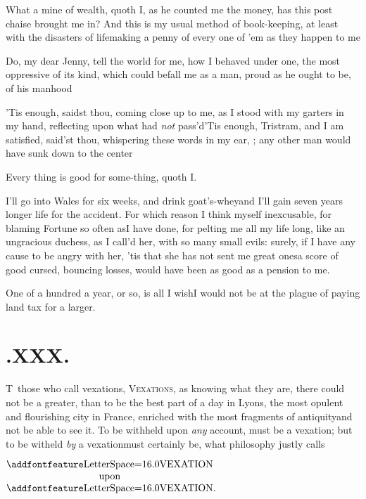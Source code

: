 \documentclass{article}
\begin{document}
\newpage
\tsh What a mine of wealth, quoth I, as\break
he counted me the money, has this post chaise brought me in? And
this is my usual method of book-keeping, at least with the
disasters of life\tsk making a penny of every one of ’em as they
happen to me\tsh

\tsh Do, my dear Jenny, tell the world for me,
how I behaved under one, the most oppressive of its kind, which
could befall me as a man, proud as he ought to be, of his
manhood\tsh

’Tis enough, saidst thou, coming close up to me, as I
stood with my garters in my hand, reflecting upon what had \textit{not}
pass’d\tsh ’Tis enough, Tristram, and I
am satisfied, said’st thou, whispering these\break
words in my ear,   \break
{} ;\tsk{}  \pb
\tsh any other man would have sunk down
to the center\tsh

\tsh Every thing is good for some-\break thing, quoth I.

\tsh I’ll go into Wales for six weeks, and drink goat’s-whey\tsk and I’ll gain seven
years longer life for the accident. For which reason I think myself inexcusable, for
blaming Fortune so often as\break I have done, for pelting me all my life long, like an
ungracious duchess, as I call’d her, with so many small evils: surely, if I have any
cause to be angry with her, ’tis that she has not sent me great ones\tsk a score of
good cursed, bouncing losses, would have been as good as a pension to me.

\newpage
\tsh One of a hundred a year, or so, is all I wish\tsk I would not be at the plague of
paying land tax for a larger.

\section{.\enspace XXX.}

\lettrine{T}{\,} those who call vexations,\break
\textsc{Vexations}, as knowing what they are,
there could not be a greater, than to be the best part of a day in Lyons, the most
opulent and flourishing city in France, enriched with the most fragments of
antiquity\tsk and not be able to see it. To be withheld upon \textit{any} account,
must be a vexation; but to be witheld \textit{by} a
vexation\tsh must certainly\break
be, what philosophy justly calls

\medskip
\centerline{$\vcenter{\halign{\hss # \hss\cr
\lss{VEXATION}\cr
upon\cr
\lss{VEXATION}\rlap{.}\cr}}$}
\end{document}
